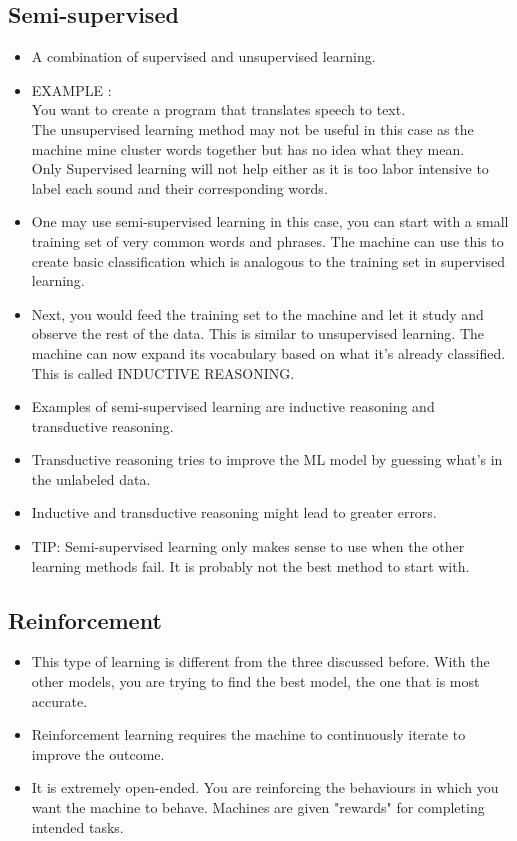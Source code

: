 \documentclass[11pt, oneside]{article}   	%
\begin{document}
\subsection{Semi-supervised}
\begin{itemize}
\item A combination of supervised and unsupervised learning.
\item EXAMPLE : \\
You want to create a program that translates speech to text. \\
The unsupervised learning method may not be useful in this case as the machine mine cluster words together but has no idea what they mean. \\
Only Supervised learning will not help either as it is too labor intensive to label each sound and their corresponding words. \\
\item One may use semi-supervised learning in this case, you can start with a small training set of very common words and phrases. The machine can use this to create basic classification which is analogous to the training set in supervised learning.
\item Next, you would feed the training set to the machine and let it study and observe the rest of the data. This is similar to unsupervised learning. The machine can now expand its vocabulary based on what it's already classified. This is called INDUCTIVE REASONING.
\item Examples of semi-supervised learning are inductive reasoning and transductive reasoning.
\item Transductive reasoning tries to improve the ML model by guessing what's in the unlabeled data.
\item Inductive and transductive reasoning might lead to greater errors.
\item TIP: Semi-supervised learning only makes sense to use when the other learning methods fail. It is probably not the best method to start with.
\end{itemize}
\subsection{Reinforcement}
\begin{itemize}
\item This type of learning is different from the three discussed before. With the other models, you are trying to find the best model, the one that is most accurate. 
\item Reinforcement learning requires the machine to continuously iterate to improve the outcome.
\item It is extremely open-ended. You are reinforcing the behaviours in which you want the machine to behave. Machines are given "rewards" for completing intended tasks.
\end{itemize}
\end{document}

